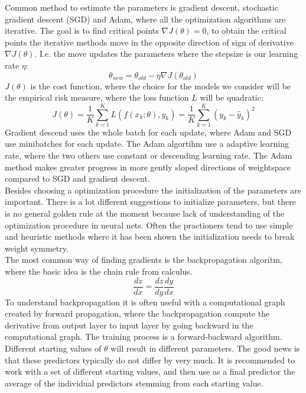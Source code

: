 Common method to estimate the parameters is gradient descent, stochastic gradient descent (SGD) and Adam, where all the optimization algorithms are iterative. The goal is to find critical points $\nabla J(\theta)=0$, to obtain the critical points the iterative methods move in the opposite direction of sign of derivative $\nabla J(\theta)$. I.e. the move updates the parameters where the stepsize is our learning rate $\eta$:
$$\theta_{new}=\theta_{old} - \eta \nabla J(\theta_{old}) $$
$J(\theta)$ is the cost function, where the choice for the models we consider will be the empirical risk measure, where the loss function $L$ will be quadratic:
$$J(\theta)= \frac{1}{K}\sum_{k=1}^{K} L(f(x_k;\theta),y_k)=\frac{1}{K}\sum_{k=1}^{K} (y_k-\hat{y}_k)^2$$
Gradient descend uses the whole batch for each update, where Adam and SGD use minibatches for each update. The Adam algortihm use a adaptive learning rate, where the two others use constant or descending learning rate. The Adam method makes greater progress in more gently sloped directions of weightspace compared to SGD and gradient descent.\\ 

Besides choosing a optimization procedure the initialization of the parameters are important. There is a lot different suggestions to initialize parameters, but there is no general golden rule at the moment because lack of understanding of the optimization procedure in neural nets. Often the practioners tend to use simple and heuristic methods where it has been shown the initialization needs to break weight symmetry.\\

The most common way of finding gradients is the backpropagation algoritm, where the basic idea is the chain rule from calculus.
$$\frac{dz}{dx}= \frac{dz}{dy} \frac{dy}{dx}$$
To understand backpropagation it is often useful with a computational graph created by forward propagation, where the backpropagation compute the derivative from output layer to input layer by going backward in the computational graph. The training process is a forward-backward algorithm. Different starting values of $\theta$ will result in different parameters. The good news is that these predictors typically do not differ by very much. It is recommended to work with a set of different starting values, and then use as a final predictor the average of the individual predictors stemming from each starting value.


